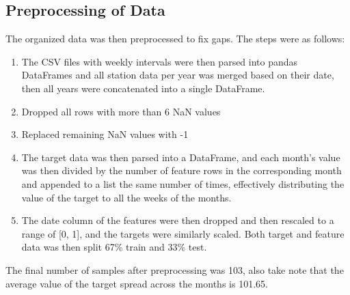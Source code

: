 \documentclass[10pt,11pt,12pt,oneside]{book}
\begin{document}
    \subsection{Preprocessing of Data}
    The organized data was then preprocessed to fix gaps. The steps were as follows:
    \begin{enumerate}
        \item The CSV files with weekly intervals were then parsed into pandas DataFrames and all station data per year was merged based on their date, then all years were concatenated into a single DataFrame.
        \item Dropped all rows with more than 6 NaN values
        \item Replaced remaining NaN values with -1
        \item The target data was then parsed into a DataFrame, and each month's value was then divided by the number of feature rows in the corresponding month and appended
to a list the same number of times, effectively distributing the value of the target to all the weeks of the months.
        \item The date column of the features were then dropped and then rescaled to a range of [0, 1], and the targets were similarly scaled. Both target and feature data was then split 67\% train and 33\%  test. 
    \end{enumerate}
    The final number of samples after preprocessing was 103, also take note that the average value of the target spread across the months is 101.65.
    \pagebreak
\end{document}
